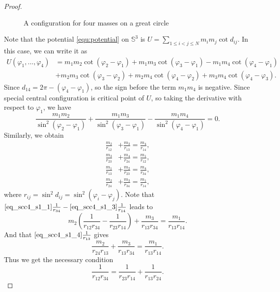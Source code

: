 \documentclass[12pt]{amsart}
\theoremstyle{definition}
\def \mb{\mathbb}
\def \vp{\varphi}       %
\def \S{\mb S}        %
\begin{document}
{\begin{proof}
\begin{figure}[!h]
    \caption{A configuration for four masses on a great circle}
    \label{fig:4-equal-m}
    \end{figure}
Note that the potential \eqref{equ:potential} on $\S^3$ is $U=\sum\limits_{1 \leq i < j \leq N} m_i m_j \cot d_{ij}$. In this case, we can write it as
\begin{equation*}
\begin{split}
U(\vp_1,...,\vp_4)&= m_1m_2 \cot (\vp_2-\vp_1) + m_1m_3 \cot (\vp_3-\vp_1)-m_1m_4 \cot (\vp_4-\vp_1)\\
&+m_2m_3 \cot (\vp_3-\vp_2)
 +m_2m_4 \cot (\vp_4-\vp_2) +m_3m_4 \cot (\vp_4-\vp_3).
\end{split}
\end{equation*}      
Since $d_{14}=2\pi-(\vp_4-\vp_1)$, so the sign before the term $m_1m_4$ is negative. 
Since special central configuration is critical point of $U$, so taking the derivative with respect to $\vp_1$, we have 
\[ \frac{m_1m_2}{ \sin^2 (\vp_2-\vp_1)} +\frac{m_1m_3}{ \sin^2 (\vp_3-\vp_1)}-\frac{m_1m_4}{ \sin^2 (\vp_4-\vp_1)}=0.  \]
Similarly, we obtain
\begin{align} 
 \frac{m_2}{r_{12}} &+ \frac{m_3}{r_{13}}=\frac{m_4}{r_{14}}, \label{eq_scc4_s1_1}\\
 \frac{m_3}{r_{23}} &+ \frac{m_4}{r_{24}}=\frac{m_1}{r_{12}}, \label{eq_scc4_s1_2} \\
 \frac{m_1}{r_{13}} &+ \frac{m_2}{r_{23}}=\frac{m_4}{r_{34}}, \label{eq_scc4_s1_3}\\
 \frac{m_2}{r_{24}} &+ \frac{m_3}{r_{34}}=\frac{m_1}{r_{14}}, \label{eq_scc4_s1_4}  
  \end{align}
 where $r_{ij}=\sin^2d_{ij}= \sin^2 (\vp_i-\vp_j)$. Note that $\eqref{eq_scc4_s1_1}\frac{1}{r_{34}}-\eqref{eq_scc4_s1_3}\frac{1}{r_{14}}$ leads to
 \[   m_2\left(\frac{1}{r_{12}r_{34}}-\frac{1}{r_{23}r_{14}} \right) +\frac{m_3}{r_{13}r_{34}} =  \frac{m_1}{r_{13}r_{14}}. \]  
 And that $\eqref{eq_scc4_s1_4}\frac{1}{r_{13}}$ gives 
 \[  \frac{m_2}{r_{24}r_{13}}  +\frac{m_3}{r_{13}r_{34}} =  \frac{m_1}{r_{13}r_{14}}. \]
 Thus we get the necessary condition 
 \begin{equation} \label{eq_scc4_s1_5}
  \frac{1}{r_{12}r_{34}}=\frac{1}{r_{23}r_{14}}+\frac{1}{r_{13}r_{24}}.
  \end{equation}


\end{proof}}
\end{document}

